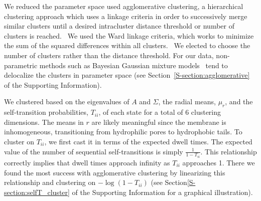 \documentclass[journal=jpcbfk,manuscript=article]{achemso}
\begin{document}
  We reduced the parameter space used agglomerative clustering, a hierarchical
  clustering approach which uses a linkage criteria in order to successively merge
  similar clusters until a desired intracluster distance threshold or number of
  clusters is reached.~\cite{pedregosa_scikit-learn_2011} We used the Ward linkage 
  criteria, which works to minimize the sum of the squared differences within all
  clusters.~\cite{ward_hierarchical_1963} We elected to choose the number of clusters
  rather than the distance threshold. For our data, non-parametric methods such as 
  Bayesian Gaussian mixture models~\cite{pedregosa_scikit-learn_2011,gelman_bayesian_2013}
  tend to delocalize the clusters in parameter space (see Section~\ref{S-section:agglomerative}
  of the Supporting Information).

  We clustered based on the eigenvalues of $A$ and $\Sigma$, the radial means, $\mu_r$, 
  and the self-transition probabilities, $T_{ii}$, of each state for a total of 6 clustering
  dimensions. The means in $r$ are likely meaningful since the membrane is inhomogeneous, 
  transitioning from hydrophilic pores to hydrophobic tails. To cluster on $T_{ii}$, we first
  cast it in terms of the expected dwell times. The expected value of the number of sequential
  self-transitions is simply $\frac{1}{1 - T_{ii}}$. This relationship correctly implies that 
  dwell times approach infinity as $T_{ii}$ approaches 1. There we found the most success with
  agglomerative clustering by linearizing this relationship and clustering on $-\log(1 - T_{ii})$
  (see Section\ref{S-section:selfT_cluster} of the Supporting Information for a graphical
  illustration).
  
%   
 
\end{document}
